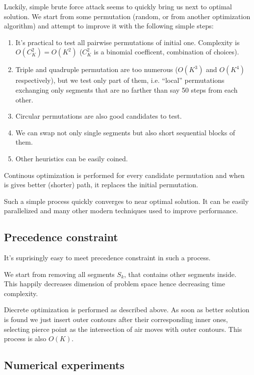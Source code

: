 \documentclass{../download/tPRS2e}
\begin{document}
Luckily,
simple brute force attack seems
to quickly bring us next to optimal solution.
We start from some permutation
(random, or from another optimization algorithm)
and attempt to improve it with the following simple steps:

\begin{enumerate}
    \item{}
    It's practical to test all pairwise permutations of initial one.
    Complexity is $O(C_K^2) = O(K^2)$
    ($C_K^2$ is a binomial coefficent, combination of choices).
    \item{}
    Triple and quadruple permutation are too numerous
    ($O(K^3)$ and $O(K^4)$ respectively),
    but we test only part of them,
    i.e. ``local'' permutations
    exchanging only segments that are no farther
    than say 50 steps from each other.
    \item{}
    Circular permutations are also good candidates to test.
    \item{}
    We can swap not only single segments but also
    short sequential blocks of them.
    \item{}
    Other heuristics can be easily coined.
\end{enumerate}

Continous optimization is performed for every candidate permutation
and when is gives better
(shorter) path,
it replaces the initial permutation.

Such a simple process quickly converges to near optimal solution.
It can be easily parallelized and many other
modern techniques used to improve performance.

\subsection{Precedence constraint}

It's suprisingly easy to meet precedence constraint in such a process.

We start from removing all segments $S_k$,
that contains other segments inside.
This happily decreases dimension of problem space
hence decreasing time complexity.

Diecrete optimization is performed as described above.
As soon as better solution is found we just
insert outer contours after their corresponding inner ones,
selecting pierce point as the intersection of air moves with
outer contours.
This process is also $O(K)$.

\subsection{Numerical experiments}
\end{document}
